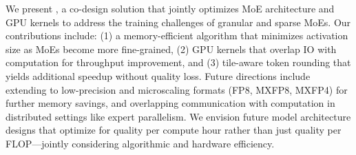 We present \Algname, a co-design solution that jointly optimizes MoE architecture and GPU kernels to address the training challenges of granular and sparse MoEs.
Our contributions include: (1) a memory-efficient algorithm that minimizes
activation size as MoEs become more fine-grained, (2) GPU kernels that overlap IO with computation for throughput improvement, and (3) tile-aware token rounding that yields additional speedup without quality loss.
Future directions include extending to low-precision and microscaling formats
(FP8, MXFP8, MXFP4) for further memory savings, and overlapping communication
with computation in distributed settings like expert parallelism. We envision future model architecture designs that optimize for quality per compute hour rather than just quality per FLOP—jointly considering algorithmic and hardware efficiency.